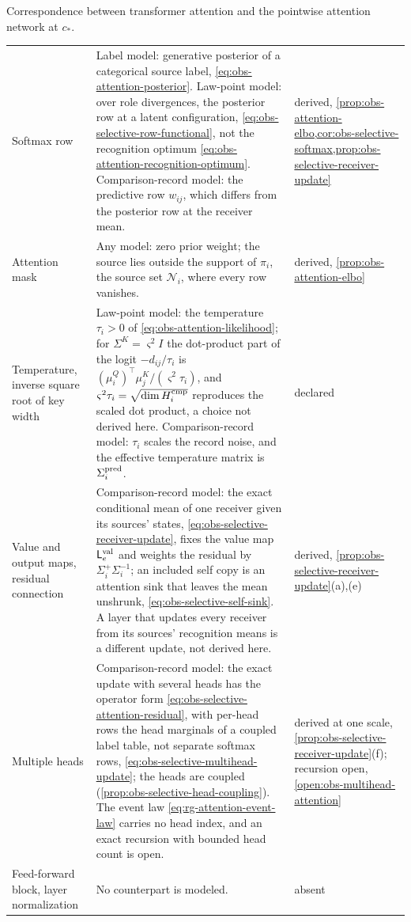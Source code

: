 \begin{sciencetable}{Correspondence between transformer attention and the pointwise attention network at $c_*$.}
\begin{tabularx}{\textwidth}{>{\raggedright\arraybackslash}p{}>{\raggedright\arraybackslash}X>{\raggedright\arraybackslash}p{}}
Softmax row & Label model: generative posterior of a categorical source label, \eqref{eq:obs-attention-posterior}. Law-point model: over role divergences, the posterior row at a latent configuration, \eqref{eq:obs-selective-row-functional}, not the recognition optimum \eqref{eq:obs-attention-recognition-optimum}. Comparison-record model: the predictive row $w_{ij}$, which differs from the posterior row at the receiver mean. & derived, \cref{prop:obs-attention-elbo,cor:obs-selective-softmax,prop:obs-selective-receiver-update} \\
Attention mask & Any model: zero prior weight; the source lies outside the support of $\pi_i$, the source set $\mathcal N_i$, where every row vanishes. & derived, \cref{prop:obs-attention-elbo} \\
Temperature, inverse square root of key width & Law-point model: the temperature $\tau_i>0$ of \eqref{eq:obs-attention-likelihood}; for $\Sigma^K=\varsigma^2I$ the dot-product part of the logit $-d_{ij}/\tau_i$ is $(\mu_i^Q)^\top\mu_j^K/(\varsigma^2\tau_i)$, and $\varsigma^2\tau_i=\sqrt{\dim H^{\rm cmp}_i}$ reproduces the scaled dot product, a choice not derived here. Comparison-record model: $\tau_i$ scales the record noise, and the effective temperature matrix is $\Sigma_i^{\rm pred}$. & declared \\
Value and output maps, residual connection & Comparison-record model: the exact conditional mean of one receiver given its sources' states, \eqref{eq:obs-selective-receiver-update}, fixes the value map $\mathsf L_e^{\rm val}$ and weights the residual by $\Sigma_i^+\Sigma_i^{-1}$; an included self copy is an attention sink that leaves the mean unshrunk, \eqref{eq:obs-selective-self-sink}. A layer that updates every receiver from its sources' recognition means is a different update, not derived here. & derived, \cref{prop:obs-selective-receiver-update}(a),(e) \\
Multiple heads & Comparison-record model: the exact update with several heads has the operator form \eqref{eq:obs-selective-attention-residual}, with per-head rows the head marginals of a coupled label table, not separate softmax rows, \eqref{eq:obs-selective-multihead-update}; the heads are coupled (\cref{prop:obs-selective-head-coupling}). The event law \eqref{eq:rg-attention-event-law} carries no head index, and an exact recursion with bounded head count is open. & derived at one scale, \cref{prop:obs-selective-receiver-update}(f); recursion open, \cref{open:obs-multihead-attention} \\
Feed-forward block, layer normalization & No counterpart is modeled. & absent \\
\bottomrule
\end{tabularx}
\end{sciencetable}

